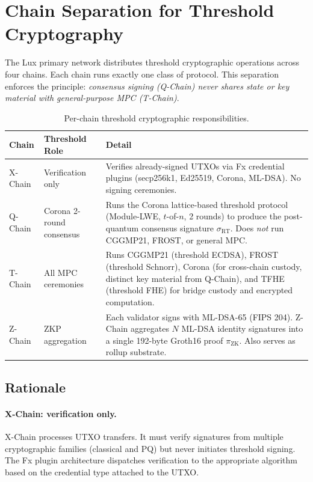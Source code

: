 \section{Chain Separation for Threshold Cryptography}

\label{sec:chain-sep}

The Lux primary network distributes threshold cryptographic operations
across four chains.  Each chain runs exactly one class of protocol.
This separation enforces the principle: \emph{consensus signing
(Q-Chain) never shares state or key material with general-purpose MPC
(T-Chain)}.

\begin{table}[ht]
\centering
\small
\begin{tabular}{@{}llp{6.8cm}@{}}
\toprule
\textbf{Chain} & \textbf{Threshold Role} & \textbf{Detail} \\
\midrule
X-Chain & Verification only &
  Verifies already-signed UTXOs via Fx credential plugins
  (secp256k1, Ed25519, Corona, ML-DSA).  No signing ceremonies. \\[3pt]
Q-Chain & Corona 2-round consensus &
  Runs the Corona lattice-based threshold protocol
  (Module-LWE, $t$-of-$n$, 2 rounds) to produce the post-quantum
  consensus signature $\sigma_{\mathrm{RT}}$.  Does \emph{not} run
  CGGMP21, FROST, or general MPC. \\[3pt]
T-Chain & All MPC ceremonies &
  Runs CGGMP21 (threshold ECDSA), FROST (threshold Schnorr),
  Corona (for cross-chain custody, distinct key material from Q-Chain),
  and TFHE (threshold FHE) for bridge custody and encrypted
  computation. \\[3pt]
Z-Chain & ZKP aggregation &
  Each validator signs with ML-DSA-65 (FIPS 204).  Z-Chain aggregates
  $N$ ML-DSA identity signatures into a single 192-byte Groth16 proof
  $\pi_{\mathrm{ZK}}$.  Also serves as rollup substrate. \\
\bottomrule
\end{tabular}
\caption{Per-chain threshold cryptographic responsibilities.}
\label{tab:chain-sep}
\end{table}

\subsection{Rationale}

\paragraph{X-Chain: verification only.}
X-Chain processes UTXO transfers.  It must verify signatures from
multiple cryptographic families (classical and PQ) but never initiates
threshold signing.  The Fx plugin architecture dispatches verification
to the appropriate algorithm based on the credential type attached to
the UTXO.

